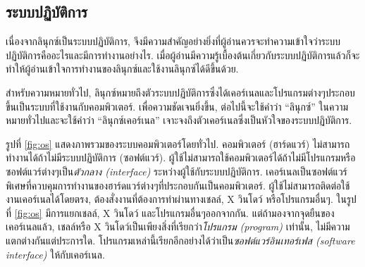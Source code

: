 \begin{thwbr}
\section{ระบบปฏิบัติการ}
เนื่องจากลินุกซ์เป็นระบบปฏิบัติการ, จึงมีความสำคัญอย่างยิ่งที่ผู้อ่านควรจะทำความเข้าใจว่าระบบปฏิบัติการคืออะไรและมีการทำงานอย่างไร. เมื่อผู้อ่านมีความรู้เบื้องต้นเกี่ยวกับระบบปฏิบัติการแล้วก็จะทำให้ผู้อ่านเข้าใจการทำงานของลินุกซ์และใช้งานลินุกซ์ได้ดีขึ้นด้วย.

สำหรับความหมายทั่วไป, ลินุกซ์หมายถึงตัวระบบปฏิบัติการซึ่งได้เคอร์เนลและโปรแกรมต่างๆประกอบขึ้นเป็นระบบที่ใช้งานกับคอมพิวเตอร์. เพื่อความชัดเจนยิ่งขึ้น, ต่อไปนี้จะใช้คำว่า ``ลินุกซ์'' ในความหมายทั่วไปและจะใช้คำว่า ``ลินุกซ์เคอร์เนล'' เจาะจงถึงตัวเคอร์เนลซึ่งเป็นหัวใจของระบบปฏิบัติการ. 

\begin{figure}
\end{figure}

รูปที่%
%
 \ref{fig:os} แสดงภาพรวมของระบบคอมพิวเตอร์โดยทั่วไป. คอมพิวเตอร์ (ฮาร์ดแวร์) ไม่สามารถทำงานได้ถ้าไม่มีระบบปฏิบัติการ (ซอฟต์แวร์). ผู้ใช้ไม่สามารถใช้คอมพิวเตอร์ได้ถ้าไม่มีโปรแกรมหรือซอฟต์แวร์ต่างๆเป็น\emph{ตัวกลาง (interface)} ระหว่างผู้ใช้กับระบบปฏิบัติการ. เคอร์เนลเป็นซอฟต์แวร์พิเศษที่ควบคุมการทำงานของฮาร์ดแวร์ต่างๆที่ประกอบกันเป็นคอมพิวเตอร์. ผู้ใช้ไม่สามารถติดต่อใช้งานเคอร์เนลได้โดยตรง, ต้องสั่งงานที่ต้องการทำผ่านทางเชลล์, X วินโดว์ หรือโปรแกรมอื่นๆ. ในรูปที่ \ref{fig:os} มีการแยกเชลล์, X วินโดว์ และโปรแกรมอื่นๆออกจากกัน. แต่ถ้ามองจากจุดยืนของเคอร์เนลแล้ว, เชลล์หรือ X วินโดว์เป็นเพียงสิ่งที่เรียกว่า\emph{โปรแกรม (program)} เท่านั้น, ไม่มีความแตกต่างกันแต่ประการใด. โปรแกรมเหล่านี้เรียกอีกอย่างได้ว่าเป็น\emph{ซอฟต์แวร์อินเทอร์เฟส (software interface)} ให้กับเคอร์เนล. 




\end{thwbr}
